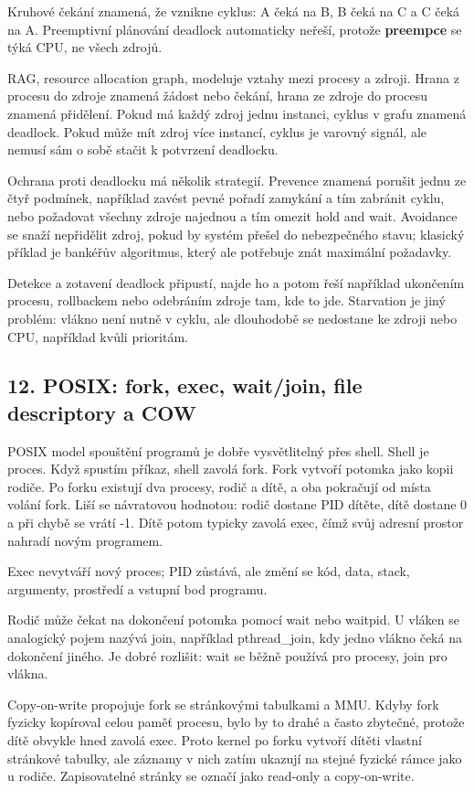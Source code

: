 \documentclass[11pt,a4paper]{article}
\begin{document}
Kruhové čekání znamená, že vznikne cyklus: A čeká na B, B čeká na C a C čeká na A. Preemptivní plánování deadlock automaticky neřeší, protože \textbf{preempce} se týká CPU, ne všech zdrojů.

RAG, resource allocation graph, modeluje vztahy mezi procesy a zdroji. Hrana z procesu do zdroje znamená žádost nebo čekání, hrana ze zdroje do procesu znamená přidělení. Pokud má každý zdroj jednu instanci, cyklus v grafu znamená deadlock. Pokud může mít zdroj více instancí, cyklus je varovný signál, ale nemusí sám o sobě stačit k potvrzení deadlocku.

Ochrana proti deadlocku má několik strategií. Prevence znamená porušit jednu ze čtyř podmínek, například zavést pevné pořadí zamykání a tím zabránit cyklu, nebo požadovat všechny zdroje najednou a tím omezit hold and wait. Avoidance se snaží nepřidělit zdroj, pokud by systém přešel do nebezpečného stavu; klasický příklad je bankéřův algoritmus, který ale potřebuje znát maximální požadavky.

Detekce a zotavení deadlock připustí, najde ho a potom řeší například ukončením procesu, rollbackem nebo odebráním zdroje tam, kde to jde. Starvation je jiný problém: vlákno není nutně v cyklu, ale dlouhodobě se nedostane ke zdroji nebo CPU, například kvůli prioritám.

\subsection*{12. POSIX: fork, exec, wait/join, file descriptory a COW}

POSIX model spouštění programů je dobře vysvětlitelný přes shell. Shell je proces. Když spustím příkaz, shell zavolá fork. Fork vytvoří potomka jako kopii rodiče. Po forku existují dva procesy, rodič a dítě, a oba pokračují od místa volání fork. Liší se návratovou hodnotou: rodič dostane PID dítěte, dítě dostane 0 a při chybě se vrátí -1. Dítě potom typicky zavolá exec, čímž svůj adresní prostor nahradí novým programem.

Exec nevytváří nový proces; PID zůstává, ale změní se kód, data, stack, argumenty, prostředí a vstupní bod programu.

Rodič může čekat na dokončení potomka pomocí wait nebo waitpid. U vláken se analogický pojem nazývá join, například pthread\_join, kdy jedno vlákno čeká na dokončení jiného. Je dobré rozlišit: wait se běžně používá pro procesy, join pro vlákna.

Copy-on-write propojuje fork se stránkovými tabulkami a MMU. Kdyby fork fyzicky kopíroval celou paměť procesu, bylo by to drahé a často zbytečné, protože dítě obvykle hned zavolá exec. Proto kernel po forku vytvoří dítěti vlastní stránkové tabulky, ale záznamy v nich zatím ukazují na stejné fyzické rámce jako u rodiče. Zapisovatelné stránky se označí jako read-only a copy-on-write.
\end{document}
